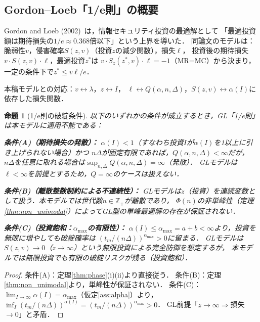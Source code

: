 \documentclass[12pt,a4paper]{article}
\theoremstyle{plain}
\newtheorem{proposition}[theorem]{命題}
\theoremstyle{definition}
\theoremstyle{remark}
\newcommand{\Z}{\mathbb{Z}}
\begin{document}
\subsection{Gordon--Loeb「1/e則」の概要}

Gordon and Loeb (2002)~\cite{gordon2002}は，情報セキュリティ投資の最適解として
「最適投資額は期待損失の$1/e\approx0.368$倍以下」という上界を導いた．
同論文のモデルは：脆弱性$v$，侵害確率$S(z,v)$（投資$z$の減少関数），損失$\ell$，
投資後の期待損失$v\cdot S(z,v)\cdot\ell$，最適投資$z^*$は
$v\cdot S_z(z^*,v)\cdot\ell=-1$（MR=MC）から決まり，
一定の条件下で$z^*\le v\ell/e$．

本稿モデルとの対応：$v\leftrightarrow\lambda$，$z\leftrightarrow I$，
$\ell\leftrightarrow Q(\alpha,n,\Delta)$，$S(z,v)\leftrightarrow\alpha(I)$に依存した損失関数．

\begin{proposition}[1/e則の破綻条件]\label{prop:gl_breakdown}
以下のいずれかの条件が成立するとき，GL「1/e則」は本モデルに適用不能である：

\noindent\textbf{条件(A)（期待損失の発散）：}
$\alpha(I)<1$（すなわち投資$I$が$\alpha(I)$を1以上に引き上げられない場合）かつ
$n\Delta$が固定有限であれば，$Q(\alpha,n,\Delta)<\infty$だが，
$n\Delta$を任意に取れる場合は$\sup_{n,\Delta}Q(\alpha,n,\Delta)=\infty$（発散）．
GLモデルは$\ell<\infty$を前提とするため，$Q=\infty$のケースは扱えない．

\noindent\textbf{条件(B)（離散整数制約による不連続性）：}
GLモデルは$z$（投資）を連続変数として扱う．本モデルでは世代数$n\in\Z_+$が離散であり，
$\Phi(n)$の非単峰性（定理\ref{thm:non_unimodal}）によってGL型の単峰最適解の存在が保証されない．

\noindent\textbf{条件(C)（投資飽和：$\alpha_{\max}$の有限性）：}
$\alpha(I)\le\alpha_{\max}=a+b<\infty$より，投資を無限に増やしても破綻確率は
$(t_m/(n\Delta))^{\alpha_{\max}}>0$に留まる．
GLモデルは$S(z,v)\to0$（$z\to\infty$）という無限投資による完全防御を想定するが，
本モデルでは無限投資でも有限の破綻リスクが残る（投資飽和）．
\end{proposition}

\begin{proof}
条件(A)：定理\ref{thm:phase}(i)(ii)より直接従う．
条件(B)：定理\ref{thm:non_unimodal}より，単峰性が保証されない．
条件(C)：$\lim_{I\to\infty}\alpha(I)=\alpha_{\max}$（仮定\ref{ass:alpha}）より，
$\inf_I(t_m/(n\Delta))^{\alpha(I)}=(t_m/(n\Delta))^{\alpha_{\max}}>0$．
GL前提「$z\to\infty\Rightarrow$損失$\to0$」と矛盾．
\end{proof}
\end{document}

